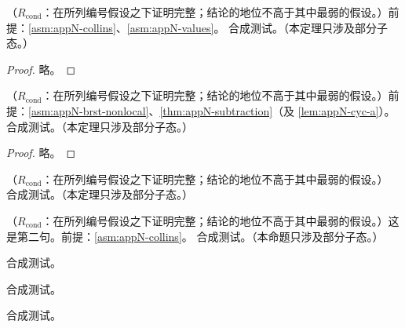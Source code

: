 \begin{theorem}\label{thm:appN-subtraction}
（$R_{\mathrm{cond}}$：在所列编号假设之下证明完整；结论的地位不高于其中最弱的假设。）前提：\cref{asm:appN-collins}、\cref{asm:appN-values}。
合成测试。（本定理只涉及部分子态。）
\end{theorem}
\begin{proof}略。\end{proof}

\begin{theorem}\label{thm:appN-structure}
（$R_{\mathrm{cond}}$：在所列编号假设之下证明完整；结论的地位不高于其中最弱的假设。）前提：\cref{asm:appN-brst-nonlocal}、\cref{thm:appN-subtraction}（及 \cref{lem:appN-cyc-a}）。
合成测试。（本定理只涉及部分子态。）
\end{theorem}
\begin{proof}略。\end{proof}

\begin{theorem}\label{thm:appN-noprem}
（$R_{\mathrm{cond}}$：在所列编号假设之下证明完整；结论的地位不高于其中最弱的假设。）
合成测试。（本定理只涉及部分子态。）
\end{theorem}

\begin{proposition}\label{prop:appN-late}
（$R_{\mathrm{cond}}$：在所列编号假设之下证明完整；结论的地位不高于其中最弱的假设。）这是第二句。前提：\cref{asm:appN-collins}。
合成测试。（本命题只涉及部分子态。）
\end{proposition}

\begin{lemma}[环 A]\label{lem:appN-cyc-a}
合成测试。
\end{lemma}

\begin{lemma}[环 B]\label{lem:appN-cyc-b}
合成测试。
\end{lemma}

\begin{lemma}[附录中的辅助引理]\label{lem:appN-hidden}
合成测试。
\end{lemma}
